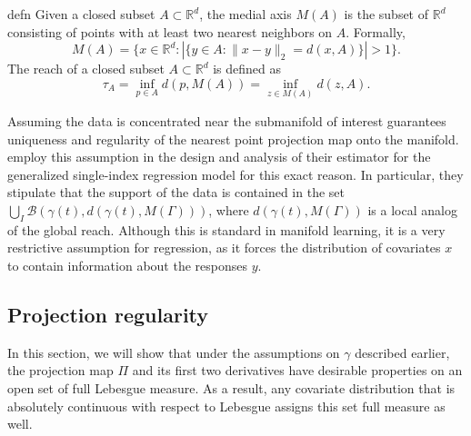 \documentclass[11pt]{article}
\begin{document}
\begin{restatable}{defn}{}
    Given a closed subset $A \subset \mathbb{R}^d$, the medial axis $M(A)$ is the subset of $\mathbb{R}^d$ consisting of points with at least two nearest neighbors on $A$. Formally,
    \begin{equation}
    M(A) = \{x \in \mathbb{R}^d : |\{y \in A : \|x-y\|_2 = d(x,A)\}| > 1\}. \label{eq: medial axis definition}
    \end{equation}
    The reach of a closed subset $A \subset \mathbb{R}^d$ is defined as 
    \begin{equation}
        \tau_A = \inf_{p\in A} d(p,M(A)) = \inf_{z\in M(A)}d(z,A). \label{eq: reach definition}
    \end{equation}
\end{restatable}

Assuming the data is concentrated near the submanifold of interest guarantees uniqueness and regularity of the nearest point projection map onto the manifold. \citet{wu2024conditional} employ this assumption in the design and analysis of their estimator for the generalized single-index regression model for this exact reason. In particular, they stipulate that the support of the data is contained in the set $\bigcup_{I}\mathcal{B}(\gamma(t), d(\gamma(t), M(\Gamma)))$, where $d(\gamma(t), M(\Gamma))$ is a local analog of the global reach. Although this is standard in manifold learning, it is a very restrictive assumption for regression, as it forces the distribution of covariates $x$ to contain information about the responses $y$. 



\subsection{Projection regularity}
In this section, we will show that under the assumptions on $\gamma$ described earlier, the projection map $\Pi$ and its first two derivatives have desirable properties on an open set of full Lebesgue measure. As a result, any covariate distribution that is absolutely continuous with respect to Lebesgue assigns this set full measure as well.  
\end{document}
